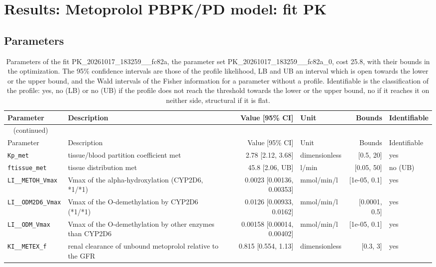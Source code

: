 \section{Results: Metoprolol PBPK/PD model: fit PK}

\subsection{Parameters}

\begin{longtable}{llrlrl}
\caption{Parameters of the fit PK\_20261017\_183259\_\_fc82a, the parameter set PK\_20261017\_183259\_\_fc82a\_0, cost 25.8, with their bounds in the optimization. The 95\% confidence intervals are those of the profile likelihood, LB and UB an interval which is open towards the lower or the upper bound, and the Wald intervals of the Fisher information for a parameter without a profile. Identifiable is the classification of the profile: yes, no (LB) or no (UB) if the profile does not reach the threshold towards the lower or the upper bound, no if it reaches it on neither side, structural if it is flat.}\label{tab:parameters:PK_20261017_183259__fc82a} \\
\toprule
Parameter & Description & Value [95\% CI] & Unit & Bounds & Identifiable \\
\midrule
\endfirsthead
\multicolumn{6}{l}{\small\tablename~\thetable{} (continued)} \\
\toprule
Parameter & Description & Value [95\% CI] & Unit & Bounds & Identifiable \\
\midrule
\endhead
\bottomrule
\endlastfoot
\texttt{Kp\_met} & tissue/blood partition coefficient met & 2.78 [2.12, 3.68] & dimensionless & [0.5, 20] & yes \\
\texttt{ftissue\_met} & tissue distribution met & 45.8 [2.06, UB] & l/min & [0.05, 50] & no (UB) \\
\texttt{LI\_\_METOH\_Vmax} & Vmax of the alpha-hydroxylation (CYP2D6, *1/*1) & 0.0023 [0.00136, 0.00353] & mmol/min/l & [1e-05, 0.1] & yes \\
\texttt{LI\_\_ODM2D6\_Vmax} & Vmax of the O-demethylation by CYP2D6 (*1/*1) & 0.0126 [0.00933, 0.0162] & mmol/min/l & [0.0001, 0.5] & yes \\
\texttt{LI\_\_ODM\_Vmax} & Vmax of the O-demethylation by other enzymes than CYP2D6 & 0.00158 [0.00014, 0.00402] & mmol/min/l & [1e-05, 0.1] & yes \\
\texttt{KI\_\_METEX\_f} & renal clearance of unbound metoprolol relative to the GFR & 0.815 [0.554, 1.13] & dimensionless & [0.3, 3] & yes \\

\end{longtable}
